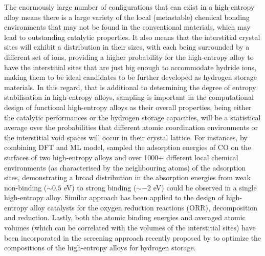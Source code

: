 The enormously large number of configurations that can exist in a high-entropy alloy means there is a large variety of the local (metastable) chemical bonding environments that may not be found in the conventional materials, which may lead to outstanding catalytic properties. It also means that the interstitial crystal sites will exhibit a distribution in their sizes, with each being surrounded by a different set of ions, providing a higher probability for the high-entropy alloy to have the interstitial sites that are just big enough to accommodate hydride ions, making them to be ideal candidates to be further developed as hydrogen storage materials.\cite{marques2021review} In this regard, that is additional to determining the degree of entropy stabilisation in high-entropy alloys, sampling is important  in the computational design of functional high-entropy alloys as their overall properties, being either the catalytic performances or the hydrogen storage capacities, will be a statistical average over the probabilities that different atomic coordination environments or the interstitial void spaces will occur in their crystal lattice. For instances, by combining DFT and ML model, \citet{pedersen2020high} sampled the adsorption energies of CO on the surfaces of two high-entropy alloys  and  over 1000+ different local chemical environments (as characterised by the neighbouring atoms) of the adsorption sites, demonstrating a broad distribution in the absorption energies from weak non-binding ($\sim 0.5$ eV) to strong binding ($\sim -2$ eV) could be observed in a single high-entropy alloy. Similar approach has been applied to the design of high-entropy alloy catalysts for the oxygen reduction reactions (ORR),\cite{batchelor2021complex,pedersen2021bayesian}  decomposition\cite{xie2019highly,yao2020computationally} and   reduction.\cite{chen2019identifying} Lastly, both the atomic binding energies and averaged atomic volumes (which can be correlated with the volumes of the interstitial sites) have been incorporated in the screening approach recently proposed by \citet{witman2021data} to optimize the compositions of the high-entropy alloys for hydrogen storage.

